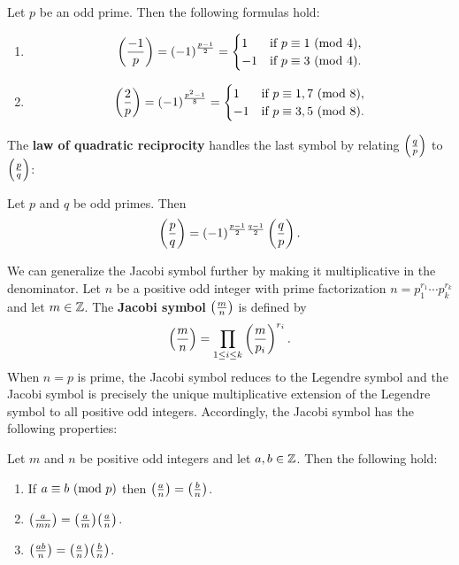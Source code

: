     \begin{proposition*}
      Let $p$ be an odd prime. Then the following formulas hold:
      \begin{enumerate}[label=(\roman*)]
        \item
        \[
          \left(\frac{-1}{p}\right) = (-1)^{\frac{p-1}{2}} = \begin{cases} 1 & \text{if $p \equiv 1 \ (\mathrm{mod}\text{ }4)$}, \\ -1 & \text{if $p \equiv 3 \ (\mathrm{mod}\text{ }4)$}. \end{cases}
        \]
        \item
        \[
          \left(\frac{2}{p}\right) = (-1)^{\frac{p^{2}-1}{8}} = \begin{cases} 1 & \text{if $p \equiv 1,7 \ (\mathrm{mod}\text{ }8)$}, \\ -1 & \text{if $p \equiv 3,5 \ (\mathrm{mod}\text{ }8)$}. \end{cases}
        \]
      \end{enumerate}
    \end{proposition*}
    The \textbf{law of quadratic reciprocity} handles the last symbol by relating $\textstyle{\left(\frac{q}{p}\right)}$ to $\textstyle{\left(\frac{p}{q}\right)}$:
    \begin{theorem*}
      Let $p$ and $q$ be odd primes. Then
      \[
        \left(\frac{p}{q}\right) = (-1)^{\frac{p-1}{2}\frac{q-1}{2}}\left(\frac{q}{p}\right).
      \]
    \end{theorem*}
    We can generalize the Jacobi symbol further by making it multiplicative in the denominator. Let $n$ be a positive odd integer with prime factorization $n = p_{1}^{r_{1}} \cdots p_{k}^{r_{k}}$ and let $m \in \mathbb{Z}$. The \textbf{Jacobi symbol} $\textstyle{\left(\frac{m}{n}\right)}$ is defined by
    \[
      \left(\frac{m}{n}\right) = \prod_{1 \le i \le k}\left(\frac{m}{p_{i}}\right)^{r_{i}}.
    \]
    When $n = p$ is prime, the Jacobi symbol reduces to the Legendre symbol and the Jacobi symbol is precisely the unique multiplicative extension of the Legendre symbol to all positive odd integers. Accordingly, the Jacobi symbol has the following properties:
    \begin{proposition}
      Let $m$ and $n$ be positive odd integers and let $a,b \in \mathbb{Z}$. Then the following hold:
      \begin{enumerate}[label=(\roman*)]
        \item If $a \equiv b \ (\mathrm{mod}\text{ }p)$ then $\textstyle{\left(\frac{a}{n}\right)} = \textstyle{\left(\frac{b}{n}\right)}$.
        \item $\textstyle{\left(\frac{a}{mn}\right)} = \textstyle{\left(\frac{a}{m}\right)}\textstyle{\left(\frac{a}{n}\right)}$.
        \item $\textstyle{\left(\frac{ab}{n}\right)} = \textstyle{\left(\frac{a}{n}\right)}\textstyle{\left(\frac{b}{n}\right)}$.
      \end{enumerate}
    \end{proposition}
